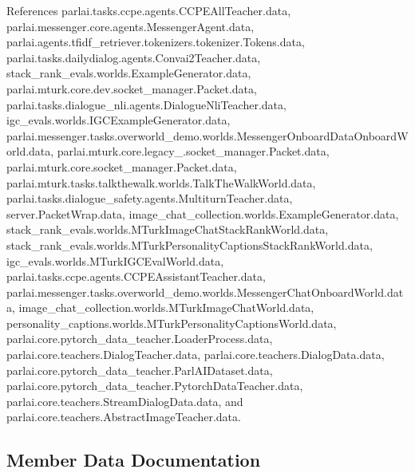 References parlai.\+tasks.\+ccpe.\+agents.\+C\+C\+P\+E\+All\+Teacher.\+data, parlai.\+messenger.\+core.\+agents.\+Messenger\+Agent.\+data, parlai.\+agents.\+tfidf\+\_\+retriever.\+tokenizers.\+tokenizer.\+Tokens.\+data, parlai.\+tasks.\+dailydialog.\+agents.\+Convai2\+Teacher.\+data, stack\+\_\+rank\+\_\+evals.\+worlds.\+Example\+Generator.\+data, parlai.\+mturk.\+core.\+dev.\+socket\+\_\+manager.\+Packet.\+data, parlai.\+tasks.\+dialogue\+\_\+nli.\+agents.\+Dialogue\+Nli\+Teacher.\+data, igc\+\_\+evals.\+worlds.\+I\+G\+C\+Example\+Generator.\+data, parlai.\+messenger.\+tasks.\+overworld\+\_\+demo.\+worlds.\+Messenger\+Onboard\+Data\+Onboard\+World.\+data, parlai.\+mturk.\+core.\+legacy\+\_.\+socket\+\_\+manager.\+Packet.\+data, parlai.\+mturk.\+core.\+socket\+\_\+manager.\+Packet.\+data, parlai.\+mturk.\+tasks.\+talkthewalk.\+worlds.\+Talk\+The\+Walk\+World.\+data, parlai.\+tasks.\+dialogue\+\_\+safety.\+agents.\+Multiturn\+Teacher.\+data, server.\+Packet\+Wrap.\+data, image\+\_\+chat\+\_\+collection.\+worlds.\+Example\+Generator.\+data, stack\+\_\+rank\+\_\+evals.\+worlds.\+M\+Turk\+Image\+Chat\+Stack\+Rank\+World.\+data, stack\+\_\+rank\+\_\+evals.\+worlds.\+M\+Turk\+Personality\+Captions\+Stack\+Rank\+World.\+data, igc\+\_\+evals.\+worlds.\+M\+Turk\+I\+G\+C\+Eval\+World.\+data, parlai.\+tasks.\+ccpe.\+agents.\+C\+C\+P\+E\+Assistant\+Teacher.\+data, parlai.\+messenger.\+tasks.\+overworld\+\_\+demo.\+worlds.\+Messenger\+Chat\+Onboard\+World.\+data, image\+\_\+chat\+\_\+collection.\+worlds.\+M\+Turk\+Image\+Chat\+World.\+data, personality\+\_\+captions.\+worlds.\+M\+Turk\+Personality\+Captions\+World.\+data, parlai.\+core.\+pytorch\+\_\+data\+\_\+teacher.\+Loader\+Process.\+data, parlai.\+core.\+teachers.\+Dialog\+Teacher.\+data, parlai.\+core.\+teachers.\+Dialog\+Data.\+data, parlai.\+core.\+pytorch\+\_\+data\+\_\+teacher.\+Parl\+A\+I\+Dataset.\+data, parlai.\+core.\+pytorch\+\_\+data\+\_\+teacher.\+Pytorch\+Data\+Teacher.\+data, parlai.\+core.\+teachers.\+Stream\+Dialog\+Data.\+data, and parlai.\+core.\+teachers.\+Abstract\+Image\+Teacher.\+data.



\subsection{Member Data Documentation}
\mbox{\label{classparlai_1_1tasks_1_1dialogue__safety_1_1agents_1_1MultiturnTeacher_a6a2355fab338fcf40b7eb1b183caa526}} 
